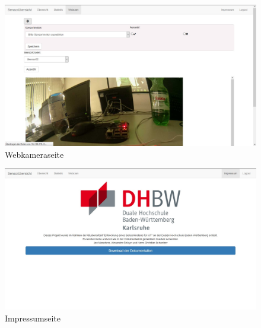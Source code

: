\begin{landscape}
	\begin{figure}[htb]
		\includegraphics[width=\linewidth, height=.9\textheight]{Bilder/Anhang/webcam.jpg}
		\caption[]{Webkameraseite}
		\label{webkameraseite}
	\end{figure}
\end{landscape}
\begin{landscape}
	\begin{figure}[htb]
		\includegraphics[width=\linewidth, height=.9\textheight]{Bilder/Anhang/impressum.jpg}
		\caption[]{Impressumseite}
		\label{impressum}
	\end{figure}
\end{landscape}
